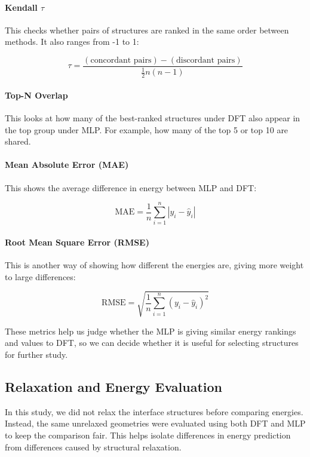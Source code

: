 \paragraph{Kendall \( \tau \)}

This checks whether pairs of structures are ranked in the same order between methods. It also ranges from -1 to 1:

\[
\tau = \frac{(\text{concordant pairs}) - (\text{discordant pairs})}{\frac{1}{2}n(n-1)}
\]

\paragraph{Top-N Overlap}

This looks at how many of the best-ranked structures under DFT also appear in the top group under MLP. For example, how many of the top 5 or top 10 are shared.

\paragraph{Mean Absolute Error (MAE)}

This shows the average difference in energy between MLP and DFT:

\[
\text{MAE} = \frac{1}{n} \sum_{i=1}^{n} |y_i - \hat{y}_i|
\]

\paragraph{Root Mean Square Error (RMSE)}

This is another way of showing how different the energies are, giving more weight to large differences:

\[
\text{RMSE} = \sqrt{\frac{1}{n} \sum_{i=1}^{n} (y_i - \hat{y}_i)^2}
\]

These metrics help us judge whether the MLP is giving similar energy rankings and values to DFT, so we can decide whether it is useful for selecting structures for further study.

\subsection{Relaxation and Energy Evaluation}

In this study, we did not relax the interface structures before comparing energies. Instead, the same unrelaxed geometries were evaluated using both DFT and MLP to keep the comparison fair. This helps isolate differences in energy prediction from differences caused by structural relaxation.

